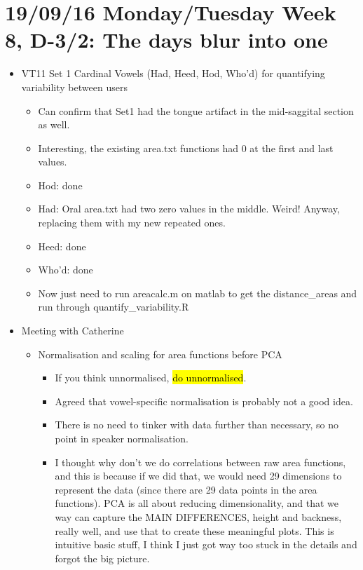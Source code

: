 \documentclass{article}
\begin{document}
\section*{19/09/16 Monday/Tuesday Week 8, D-3/2: The days blur into one}
\begin{itemize}
    \item VT11 Set 1 Cardinal Vowels (Had, Heed, Hod, Who'd) for quantifying variability between users
    \begin{itemize}
        \item Can confirm that Set1 had the tongue artifact in the mid-saggital section as well.
        \item Interesting, the existing area.txt functions had 0 at the first and last values.
        \item Hod: done
        \item Had: Oral area.txt had two zero values in the middle. Weird! Anyway, replacing them with my new repeated ones.
        \item Heed: done
        \item Who'd: done
        \item Now just need to run areacalc.m on matlab to get the distance\_areas and run through quantify\_variability.R
    \end{itemize}   
    \item Meeting with Catherine
    \begin{itemize}
        \item Normalisation and scaling for area functions before PCA
        \begin{itemize}
            \item If you think unnormalised, \hl{do unnormalised}.
            \item Agreed that vowel-specific normalisation is probably not a good idea.
            \item There is no need to tinker with data further than necessary, so no point in speaker normalisation.
            \item I thought why don't we do correlations between raw area functions, and this is because if we did that, we would need 29 dimensions to represent the data (since there are 29 data points in the area functions). PCA is all about reducing dimensionality, and that we way can capture the MAIN DIFFERENCES, height and backness, really well, and use that to create these meaningful plots. This is intuitive basic stuff, I think I just got way too stuck in the details and forgot the big picture.
        \end{itemize}

\end{itemize}
\end{itemize}
\end{document}
